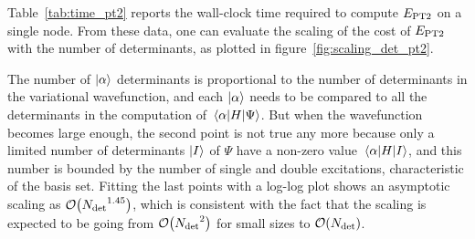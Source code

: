 \documentclass[./thesis.tex]{subfiles}
\begin{document}
Table~\ref{tab:time_pt2} reports the wall-clock time required to compute $E_\text{PT2}$
on a single node.
From these data, one can evaluate the scaling of the cost of $E_\text{PT2}$ 
with the number of determinants, as plotted in figure~\ref{fig:scaling_det_pt2}.

The number of $\ket{\alpha}$ determinants is proportional to the
number of determinants in the variational wavefunction, and each
$\ket{\alpha}$ needs to be compared to all the determinants 
in the computation of $\mel{\alpha}{H}{\Psi}$.
But when the wavefunction becomes large enough, the second point is not true any more because only a limited number of determinants $\ket{I}$ of $\Psi$ have a non-zero
value $\mel{\alpha}{H}{I}$, and this number is bounded by the number of single and double excitations, characteristic of the basis set.
Fitting the last points with a log-log plot shows an asymptotic scaling as
$\order{\Ndet^{1.45}}$, which is consistent with the fact that the scaling is
expected to be going from $\order{\Ndet^2}$ for small sizes to $\order{\Ndet}$.
\end{document}
